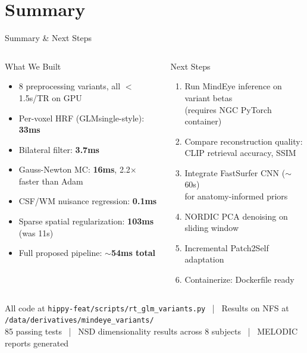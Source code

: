\documentclass[aspectratio=169,12pt]{beamer}
\begin{document}
\section{Summary}

\begin{frame}{Summary \& Next Steps}
\begin{columns}[T]
\begin{block}{What We Built}
\begin{itemize}
    \item 8 preprocessing variants, all $<$1.5s/TR on GPU
    \item Per-voxel HRF (GLMsingle-style): \textbf{33ms}
    \item Bilateral filter: \textbf{3.7ms}
    \item Gauss-Newton MC: \textbf{16ms}, 2.2$\times$ faster than Adam
    \item CSF/WM nuisance regression: \textbf{0.1ms}
    \item Sparse spatial regularization: \textbf{103ms} (was 11s)
    \item Full proposed pipeline: \textbf{$\sim$54ms total}
\end{itemize}
\end{block}

\begin{block}{Next Steps}
\begin{enumerate}
    \item Run MindEye inference on variant betas\\(requires NGC PyTorch container)
    \item Compare reconstruction quality:\\CLIP retrieval accuracy, SSIM
    \item Integrate FastSurfer CNN ($\sim$60s)\\for anatomy-informed priors
    \item NORDIC PCA denoising on sliding window
    \item Incremental Patch2Self adaptation
    \item Containerize: Dockerfile ready
\end{enumerate}
\end{block}
\end{columns}

\vspace{0.5em}
\centering
\small
All code at \texttt{hippy-feat/scripts/rt\_glm\_variants.py} ~|~ Results on NFS at \texttt{/data/derivatives/mindeye\_variants/}\\
85 passing tests ~|~ NSD dimensionality results across 8 subjects ~|~ MELODIC reports generated
\end{frame}
\end{document}
